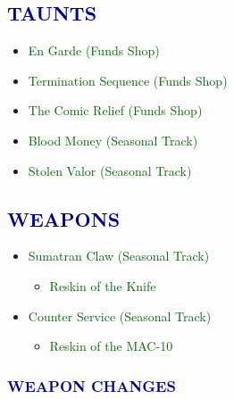 \documentclass{article}
\begin{document}
\subsection*{\textcolor{darkblue}{TAUNTS}}

\begin{itemize}
    \item \textcolor{darkgreen}{En Garde (Funds Shop)}
    \item \textcolor{darkgreen}{Termination Sequence (Funds Shop)}
    \item \textcolor{darkgreen}{The Comic Relief (Funds Shop)}
    \item \textcolor{darkgreen}{Blood Money (Seasonal Track)}
    \item \textcolor{darkgreen}{Stolen Valor (Seasonal Track)}
\end{itemize}




\subsection*{\textcolor{darkblue}{WEAPONS}}

\begin{itemize}
    \item \textcolor{darkgreen}{Sumatran Claw (Seasonal Track)}
    \begin{itemize}
        \item \textcolor{darkgreen}{Reskin of the Knife}
    \end{itemize}
    \item \textcolor{darkgreen}{Counter Service (Seasonal Track)}
    \begin{itemize}
        \item \textcolor{darkgreen}{Reskin of the MAC-10}
    \end{itemize}
\end{itemize}

\subsubsection*{\textcolor{darkblue}{WEAPON CHANGES}}
\end{document}
